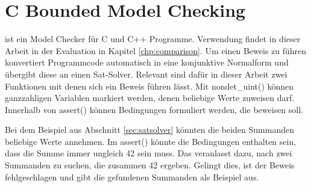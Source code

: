 \section{C Bounded Model Checking}
\label{sec:cbmc}

 ist ein Model Checker für C und C++ Programme. Verwendung findet  in dieser Arbeit in der Evaluation in Kapitel \ref{chp:comparison}.
Um einen Beweis zu führen konvertiert  Programmcode automatisch in eine konjunktive Normalform und übergibt diese an einen Sat-Solver.
Relevant sind dafür in dieser Arbeit zwei Funktionen mit denen sich ein Beweis führen lässt. Mit nondet\_uint() können ganzzahligen Variablen markiert
werden, denen  beliebige Werte zuweisen darf. Innerhalb von assert() können Bedingungen formuliert werden, die  beweisen soll.

Bei dem Beispiel aus Abschnitt \ref{sec:satsolver} könnten die beiden Summanden beliebige Werte annehmen. Im assert() könnte die Bedingungen enthalten sein,
dass die Summe immer ungleich 42 sein muss. Das veranlasst  dazu, nach zwei Summanden zu suchen, die zusammen 42 ergeben. Gelingt dies, ist der
Beweis fehlgeschlagen und  gibt die gefundenen Summanden als Beispiel aus.
